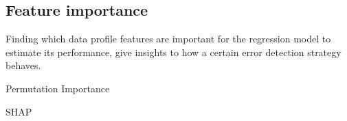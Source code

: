 \subsection{Feature importance}
Finding which data profile features are important for the regression model to estimate its performance, give insights to how a certain error detection strategy behaves. 

Permutation Importance

SHAP
